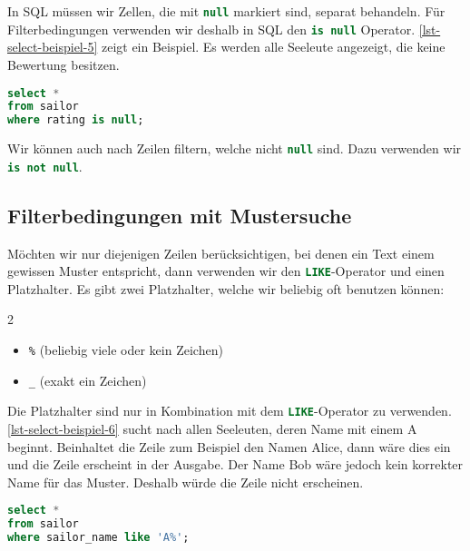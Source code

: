 In \ac{SQL} müssen wir Zellen, die mit \lstinline[language=SQL]{null} markiert sind, separat behandeln. Für Filterbedingungen verwenden wir deshalb in \ac{SQL} den \lstinline[language=SQL, morekeywords={real, text, is}]{is null} Operator. \autoref{lst-select-beispiel-5} zeigt ein Beispiel. Es werden alle Seeleute angezeigt, die keine Bewertung besitzen.

\begin{lstlisting}[language=SQL, upquote=true, morekeywords={real, text, is}, caption={Für die Filterbedingung dürfen wir \textbf{nicht} das Gleichheitszeichen (\texttt{=}) verwenden.}, label={lst-select-beispiel-5}]
select *
from sailor
where rating is null;
\end{lstlisting}

Wir können auch nach Zeilen filtern, welche nicht \lstinline[language=SQL, morekeywords={real, text, is}]{null} sind. Dazu verwenden wir \lstinline[language=SQL, morekeywords={real, text, is}]{is not null}. 

\subsection{Filterbedingungen mit Mustersuche}

Möchten wir nur diejenigen Zeilen berücksichtigen, bei denen ein Text einem gewissen Muster entspricht, dann verwenden wir den \lstinline[language=SQL, morekeywords={real, text, is}]{LIKE}-Operator und einen Platzhalter. Es gibt zwei Platzhalter, welche wir beliebig oft benutzen können:

\begin{multicols}{2}
\begin{itemize}
\item \lstinline[language=SQL]{%} (beliebig viele oder kein Zeichen)
\item \lstinline[language=SQL]{_} (exakt ein Zeichen)
\end{itemize}
\end{multicols}

Die Platzhalter sind nur in Kombination mit dem \lstinline[language=SQL, morekeywords={real, text, is}]{LIKE}-Operator zu verwenden. \autoref{lst-select-beispiel-6} sucht nach allen Seeleuten, deren Name mit einem A beginnt. Beinhaltet die Zeile zum Beispiel den Namen Alice, dann wäre dies ein  und die Zeile erscheint in der Ausgabe. Der Name Bob wäre jedoch kein korrekter Name für das Muster. Deshalb würde die Zeile nicht erscheinen.

\begin{lstlisting}[language=SQL, upquote=true, morekeywords={real, text, is}, caption={Das Prozentzeichen sorgt dafür, dass nach dem Buchstaben A ein beliebiges Zeichen folgen darf.}, label={lst-select-beispiel-6}]
select *
from sailor
where sailor_name like 'A%';
\end{lstlisting}


